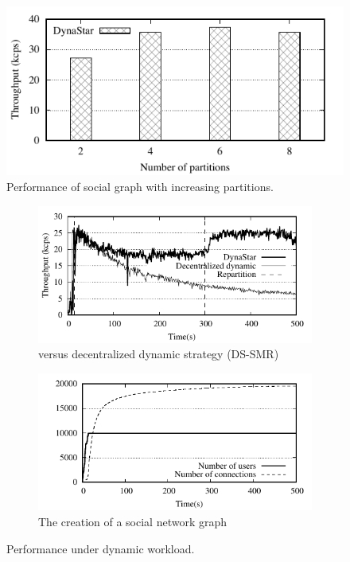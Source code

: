 \begin{figure}[ht]
	\includegraphics{figures/experiments/throughput-avg-vary-partition}
	\caption{Performance of social graph with increasing partitions.}
	\label{fig:4p1p_varying_partition_size}
\end{figure}

\begin{figure}[h!]
  \centering
  \begin{subfigure}[b]{0.45\textwidth}
    \centering
    \includegraphics[width=0.95\columnwidth]{figures/experiments/dynamicload-tp-move-4p}
    \caption{\dynastar versus decentralized dynamic strategy (DS-SMR)}
  \end{subfigure}
  \begin{subfigure}[b]{0.45\textwidth}
    \centering
    \includegraphics[width=0.95\columnwidth]{figures/experiments/dynamicload-graph-structure}
    \caption{The creation of a social network graph}
  \end{subfigure}
    \caption{Performance under dynamic workload.}
	\label{fig:dynamic_load_tput}
\end{figure}

